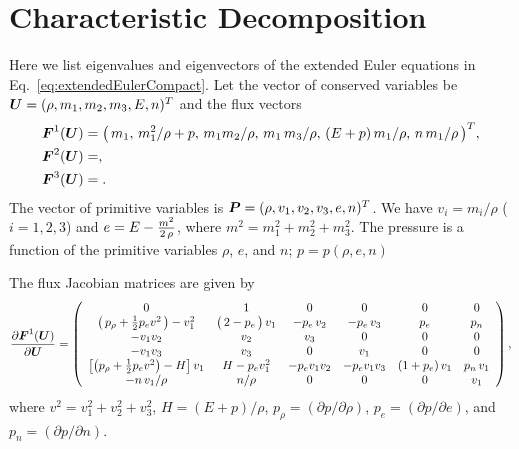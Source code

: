 \documentclass[10pt,preprint]{aastex}
\begin{document}
\section{Characteristic Decomposition}
\label{app:Characteristic}

Here we list eigenvalues and eigenvectors of the extended Euler equations in Eq.~\eqref{eq:extendedEulerCompact}.  
Let the vector of conserved variables be $\boldsymbol{U}=(\rho,m_{1},m_{2},m_{3},E,n)^{T}$ and the flux vectors
\begin{align}
  \boldsymbol{F}^{1}(\boldsymbol{U})
  &=\big(\,m_{1},\,m_{1}^{2}/\rho+p,\,m_{1}m_{2}/\rho,\,m_{1}\,m_{3}/\rho,\,(E+p)\,m_{1}/\rho,\,n\,m_{1}/\rho\,\big)^{T}, \\
  \boldsymbol{F}^{2}(\boldsymbol{U})
  &=, \\
  \boldsymbol{F}^{3}(\boldsymbol{U})
  &=.
\end{align}
The vector of primitive variables is $\boldsymbol{P}=(\rho,v_{1},v_{2},v_{3},e,n)^{T}$.  
We have $v_{i}=m_{i}/\rho$ ($i=1,2,3$) and $e=E-\frac{m^{2}}{2\,\rho}$, where $m^{2}=m_{1}^{2}+m_{2}^{2}+m_{3}^{2}$.  
The pressure is a function of the primitive variables $\rho$, $e$, and $n$; $p=p(\rho,e,n)$

The flux Jacobian matrices are given by
\begin{align}
  \frac{\partial \boldsymbol{F}^{1}(\boldsymbol{U})}{\partial \boldsymbol{U}}
  =
  \left(
  \begin{array}{cccccc}
  0 & 1 & 0 & 0 & 0 & 0 \\
  \big(\,p_{\rho}+\frac{1}{2}p_{e}v^{2}\,\big)-v_{1}^{2} & \big(\,2-p_{e}\,\big)\,v_{1} & -p_{e}\,v_{2} & -p_{e}\,v_{3} & p_{e} & p_{n} \\
  - v_{1}v_{2} & v_{2} & v_{3} & 0 & 0 & 0 \\
  - v_{1}v_{3} & v_{3} & 0 & v_{1} & 0 & 0 \\
  \big[\big(p_{\rho}+\frac{1}{2}p_{e}v^{2}\big)-H\big]\,v_{1} & H-p_{e}v_{1}^{2} & -p_{e}v_{1}v_{2} & -p_{e}v_{1}v_{3} & (1+p_{e})\,v_{1} & p_{n}\,v_{1} \\
  -n\,v_{1}/\rho & n/\rho & 0 & 0 & 0 & v_{1}
  \end{array}
  \right),
\end{align}
where $v^{2}=v_{1}^{2}+v_{2}^{2}+v_{3}^{2}$, $H=(E+p)/\rho$, $p_{\rho}=(\partial p/\partial \rho)$, $p_{e}=(\partial p/\partial e)$, and $p_{n}=(\partial p/\partial n)$.  
\end{document}
